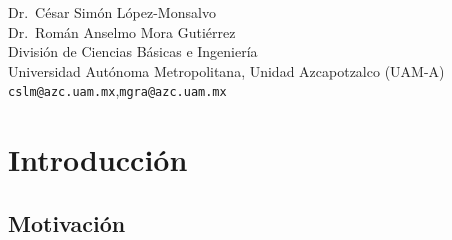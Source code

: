 \documentclass[11pt,letterpaper]{article}
\begin{document}
\begin{titlepage}
\noindent{\color{hairline}\rule{\linewidth}{0.5pt}}\par\vspace{-0.2cm}
\begin{minipage}[t]{0.6\linewidth}
  \raggedright{\escMeta\color{uamgray}
    Dr.\ César Simón López-Monsalvo\\[0.2em]
    Dr.\ Román Anselmo Mora Gutiérrez\\[0.2em]
    División de Ciencias Básicas e Ingeniería\\[0.2em]
    Universidad Autónoma Metropolitana, Unidad Azcapotzalco (UAM-A)\\[0.2em]
    \texttt{cslm@azc.uam.mx},\enspace\texttt{mgra@azc.uam.mx}}
\end{minipage}%
\hfill
\begin{minipage}[t]{0.35\linewidth}
\end{minipage}

\end{titlepage}

\pagestyle{sinlogo}
\tableofcontents
\clearpage
\pagestyle{fancy}

\section{Introducción}
\label{sec:introduccion}

\subsection{Motivación}
\end{document}
